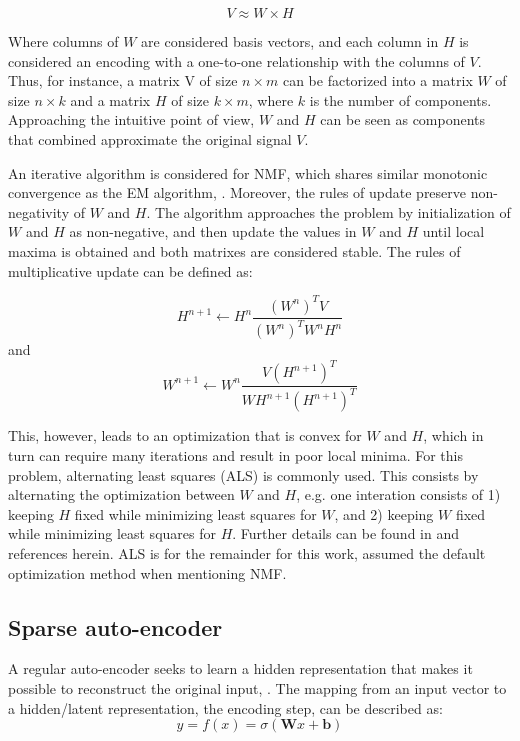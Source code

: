 \documentclass{article}
\begin{document}
\begin{equation}
V \approx W \times H
\end{equation}

Where columns of $W$ are considered basis vectors, and each column in $H$ is considered an encoding with a one-to-one relationship with the columns of $V$. Thus, for instance, a matrix V of size $n \times m$ can be factorized into a matrix $W$ of size $n \times k$ and a matrix $H$ of size $k \times m$, where $k$ is the number of components. Approaching the intuitive point of view, $W$ and $H$ can be seen as components that combined approximate the original signal $V$.

An iterative algorithm is considered for NMF, which shares similar monotonic convergence as the EM algorithm, \cite{Dempster1977}. Moreover, the rules of update preserve non-negativity of $W$ and $H$. The algorithm approaches the problem by initialization of $W$ and $H$ as non-negative, and then update the values in $W$ and $H$ until local maxima is obtained and both matrixes are considered stable. The rules of multiplicative update can be defined as:

\begin{equation}
H^{n+1} \leftarrow H^{n} \frac{(W^n)^TV}{(W^n)^TW^nH^n}
\end{equation}
and 
\begin{equation}
W^{n+1} \leftarrow W^{n} \frac{V(H^{n+1})^T}{WH^{n+1}(H^{n+1})^T}
\end{equation}

This, however, leads to an optimization that is convex for $W$ and $H$, which in turn can require many iterations and result in poor local minima. For this problem, alternating least squares (ALS) is commonly used. This consists by alternating the optimization between $W$ and $H$, e.g. one interation consists of 1) keeping $H$ fixed while minimizing least squares for $W$, and 2) keeping $W$ fixed while minimizing least squares for $H$. Further details can be found in  \cite{Langville2014} and references herein. ALS is for the remainder for this work, assumed the default optimization method when mentioning NMF.

\subsection{Sparse auto-encoder}
A regular auto-encoder seeks to learn a hidden representation that makes it possible to reconstruct the original input, \cite{Vincent}. The mapping from an input vector to a hidden/latent representation, the encoding step, can be described as:
\begin{equation}
y = f(x) = \sigma(\mathbf{W}x + \mathbf{b})
\end{equation}
\end{document}

